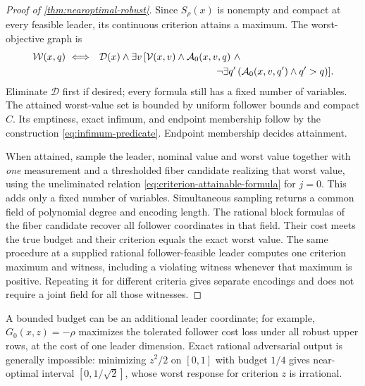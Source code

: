 \begin{proof}[Proof of \cref{thm:nearoptimal-robust}]
Since $S_\rho(x)$ is nonempty and compact at every feasible leader,
its continuous criterion attains a maximum. The worst-objective graph is
\begin{equation}\label{eq:robust-worst-formula}
 \begin{split}
 \mathcal W(x,q)\ \Longleftrightarrow\quad&\mathcal D(x)\wedge
 \exists v\,[\mathcal V(x,v)\wedge\mathcal A_0(x,v,q)\ \wedge\\
 &\hspace{42mm}\neg\exists q'\,
              (\mathcal A_0(x,v,q')\wedge q'>q)].
 \end{split}
\end{equation}
Eliminate $\mathcal D$ first if desired; every formula still has a
fixed number of variables. The attained worst-value set is bounded by
uniform follower bounds and compact $C$. Its emptiness, exact infimum,
and endpoint membership follow by the construction
\eqref{eq:infimum-predicate}. Endpoint membership decides attainment.

When attained, sample the leader, nominal value and worst value together
with \emph{one} measurement and a thresholded fiber candidate realizing
that worst value, using the uneliminated relation
\eqref{eq:criterion-attainable-formula} for $j=0$. This adds only a
fixed number of variables. Simultaneous sampling returns a common field
of polynomial degree and encoding length. The rational block formulas
of the fiber candidate recover all follower coordinates in that field.
Their cost meets the true budget and their criterion equals the exact
worst value. The same procedure at a supplied rational follower-feasible
leader computes one criterion maximum and witness, including a violating
witness whenever that maximum is positive. Repeating it for different
criteria gives separate encodings and does not require a joint field
for all those witnesses.
\end{proof}

A bounded budget can be an additional leader coordinate; for example,
$G_0(x,z)=-\rho$ maximizes the tolerated follower cost loss under all
robust upper rows, at the cost of one leader dimension. Exact
rational adversarial output is generally impossible: minimizing $z^2/2$
on $[0,1]$ with budget $1/4$ gives near-optimal interval
$[0,1/\sqrt2]$, whose worst response for criterion $z$ is irrational.

